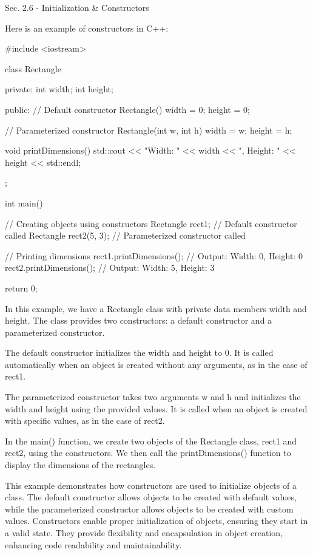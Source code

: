 \begin{notes}{Sec. 2.6 - Initialization \& Constructors}
    \begin{highlight}
        Here is an example of constructors in C++:
    \begin{code}[C++]
    #include <iostream>

    class Rectangle {
    private:
        int width;
        int height;
    
    public:
        // Default constructor
        Rectangle() {
            width = 0;
            height = 0;
        }
    
        // Parameterized constructor
        Rectangle(int w, int h) {
            width = w;
            height = h;
        }
    
        void printDimensions() {
            std::cout << "Width: " << width << ", Height: " << height << std::endl;
        }
    };
    
    int main() {
        // Creating objects using constructors
        Rectangle rect1; // Default constructor called
        Rectangle rect2(5, 3); // Parameterized constructor called
    
        // Printing dimensions
        rect1.printDimensions(); // Output: Width: 0, Height: 0
        rect2.printDimensions(); // Output: Width: 5, Height: 3
    
        return 0;
    }        
    \end{code}
        In this example, we have a Rectangle class with private data members width and height. The class provides two constructors: a default constructor and a parameterized constructor.
    
        The default constructor initializes the width and height to 0. It is called automatically when an object is created without any arguments, as in the case of rect1.
    
        The parameterized constructor takes two arguments w and h and initializes the width and height using the provided values. It is called when an object is created with specific values, 
        as in the case of rect2.
    
        In the main() function, we create two objects of the Rectangle class, rect1 and rect2, using the constructors. We then call the printDimensions() function to display the dimensions 
        of the rectangles.
    
        This example demonstrates how constructors are used to initialize objects of a class. The default constructor allows objects to be created with default values, while the parameterized constructor 
        allows objects to be created with custom values. Constructors enable proper initialization of objects, ensuring they start in a valid state. They provide flexibility and encapsulation in object 
        creation, enhancing code readability and maintainability.
    \end{highlight}
\end{notes}

